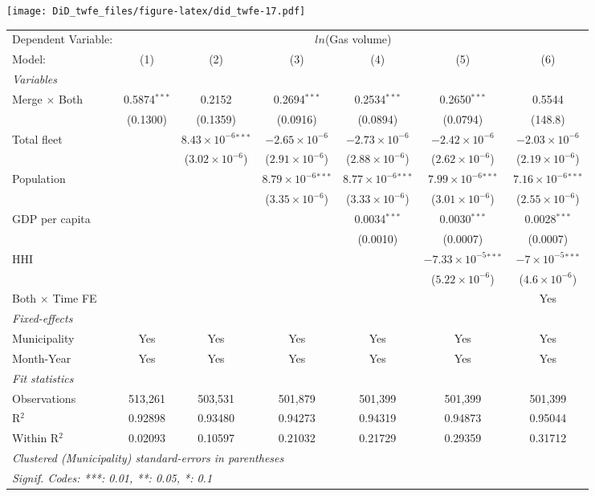 \documentclass[
]{article}
\begin{document}
\texttt{[image: DiD\_twfe\_files/figure-latex/did\_twfe-17.pdf]}

\begin{tabular}{lcccccc}
\tabularnewline\midrule\midrule
Dependent Variable:&\multicolumn{6}{c}{$ln$(Gas volume)}\\
Model:&(1) & (2) & (3) & (4) & (5) & (6)\\
\midrule \emph{Variables}&   &   &   &   &   &  \\
Merge $\times $ Both & 0.5874$^{***}$ & 0.2152 & 0.2694$^{***}$ & 0.2534$^{***}$ & 0.2650$^{***}$ & 0.5544\\
  &(0.1300) & (0.1359) & (0.0916) & (0.0894) & (0.0794) & (148.8)\\
Total fleet &    & $8.43\times 10^{-6}$$^{***}$ & $-2.65\times 10^{-6}$ & $-2.73\times 10^{-6}$ & $-2.42\times 10^{-6}$ & $-2.03\times 10^{-6}$\\
  &   & ($3.02\times 10^{-6}$) & ($2.91\times 10^{-6}$) & ($2.88\times 10^{-6}$) & ($2.62\times 10^{-6}$) & ($2.19\times 10^{-6}$)\\
Population &    &    & $8.79\times 10^{-6}$$^{***}$ & $8.77\times 10^{-6}$$^{***}$ & $7.99\times 10^{-6}$$^{***}$ & $7.16\times 10^{-6}$$^{***}$\\
  &   &    & ($3.35\times 10^{-6}$) & ($3.33\times 10^{-6}$) & ($3.01\times 10^{-6}$) & ($2.55\times 10^{-6}$)\\
GDP per capita &    &    &    & 0.0034$^{***}$ & 0.0030$^{***}$ & 0.0028$^{***}$\\
  &   &    &    & (0.0010) & (0.0007) & (0.0007)\\
HHI &    &    &    &    & $-7.33\times 10^{-5}$$^{***}$ & $-7\times 10^{-5}$$^{***}$\\
  &   &    &    &    & ($5.22\times 10^{-6}$) & ($4.6\times 10^{-6}$)\\
Both $\times$ Time FE &  &  &  &  &  & Yes\\
\midrule \emph{Fixed-effects}&   &   &   &   &   &  \\
Municipality & Yes & Yes & Yes & Yes & Yes & Yes\\
Month-Year & Yes & Yes & Yes & Yes & Yes & Yes\\
\midrule \emph{Fit statistics}&  & & & & & \\
Observations & 513,261&503,531&501,879&501,399&501,399&501,399\\
R$^2$ & 0.92898&0.93480&0.94273&0.94319&0.94873&0.95044\\
Within R$^2$ & 0.02093&0.10597&0.21032&0.21729&0.29359&0.31712\\
\midrule\midrule\multicolumn{7}{l}{\emph{Clustered (Municipality) standard-errors in parentheses}}\\
\multicolumn{7}{l}{\emph{Signif. Codes: ***: 0.01, **: 0.05, *: 0.1}}\\
\end{tabular}
\end{document}

